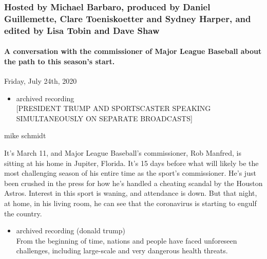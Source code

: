 \hypertarget{hosted-by-michael-barbaro-produced-by-daniel-guillemette-clare-toeniskoetter-and-sydney-harper-and-edited-by-lisa-tobin-and-dave-shaw-1}{%
\subsubsection{Hosted by Michael Barbaro, produced by Daniel
Guillemette, Clare Toeniskoetter and Sydney Harper, and edited by Lisa
Tobin and Dave
Shaw}\label{hosted-by-michael-barbaro-produced-by-daniel-guillemette-clare-toeniskoetter-and-sydney-harper-and-edited-by-lisa-tobin-and-dave-shaw-1}}

\hypertarget{a-conversation-with-the-commissioner-of-major-league-baseball-about-the-path-to-this-seasons-start-2}{%
\paragraph{A conversation with the commissioner of Major League Baseball
about the path to this season's
start.}\label{a-conversation-with-the-commissioner-of-major-league-baseball-about-the-path-to-this-seasons-start-2}}

Friday, July 24th, 2020

\begin{itemize}
\tightlist
\item
  archived recording\\
  {[}PRESIDENT TRUMP AND SPORTSCASTER SPEAKING SIMULTANEOUSLY ON
  SEPARATE BROADCASTS{]}
\end{itemize}

mike schmidt

It's March 11, and Major League Baseball's commissioner, Rob Manfred, is
sitting at his home in Jupiter, Florida. It's 15 days before what will
likely be the most challenging season of his entire time as the sport's
commissioner. He's just been crushed in the press for how he's handled a
cheating scandal by the Houston Astros. Interest in this sport is
waning, and attendance is down. But that night, at home, in his living
room, he can see that the coronavirus is starting to engulf the country.

\begin{itemize}
\tightlist
\item
  archived recording (donald trump)\\
  From the beginning of time, nations and people have faced unforeseen
  challenges, including large-scale and very dangerous health threats.
\end{itemize}

